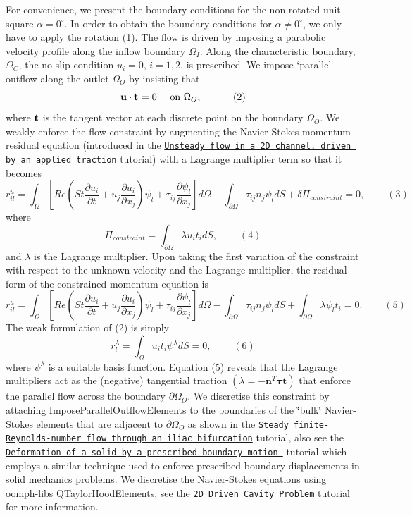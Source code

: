 For convenience, we present the boundary conditions for the non-\/rotated unit square $\alpha = 0^{\circ}$. In order to obtain the boundary conditions for $\alpha \ne 0^\circ$, we only have to apply the rotation (1). The flow is driven by imposing a parabolic velocity profile along the inflow boundary $\Omega_I$. Along the characteristic boundary, $\Omega_C$, the no-\/slip condition $u_i = 0$, $i = 1,2$, is prescribed. We impose `parallel outflow\textquotesingle{} along the outlet $\Omega_O$ by insisting that \[ {\bf u}\cdot {\bf t}_{} = 0 \mbox{\ \ \ \ on $\Omega_{O}$,} \ \ \ \ \ \ \ \ \ \ (2) \] where $ {\bf t}$ is the tangent vector at each discrete point on the boundary $ \Omega_{O}$. We weakly enforce the flow constraint by augmenting the Navier-\/\+Stokes momentum residual equation (introduced in the \href{../../../navier_stokes/rayleigh_traction_channel/html/index.html}{\tt Unsteady flow in a 2D channel, driven by an applied traction} tutorial) with a Lagrange multiplier term so that it becomes \[ r_{il}^{u} = \int_\Omega \left[ Re \left( St\frac{\partial u_i}{\partial t} + u_j\frac{\partial u_i}{\partial x_j} \right) \psi_l + \tau_{ij}\frac{\partial \psi_l}{\partial x_j} \right] d\Omega - \int_{\partial\Omega} \tau_{ij} n_j\psi_l dS + \delta \Pi_{constraint} = 0, \ \ \ \ \ \ \ \ \ \ (3) \] where \[ \Pi_{constraint} = \int_{\partial \Omega} \lambda u_i t_i dS, \ \ \ \ \ \ \ \ \ \ (4) \] and $\lambda$ is the Lagrange multiplier. Upon taking the first variation of the constraint with respect to the unknown velocity and the Lagrange multiplier, the residual form of the constrained momentum equation is \[ r_{il}^{u} = \int_\Omega \left[ Re \left( St\frac{\partial u_i}{\partial t} + u_j\frac{\partial u_i}{\partial x_j} \right) \psi_l + \tau_{ij}\frac{\partial \psi_l}{\partial x_j} \right] d\Omega - \int_{\partial\Omega} \tau_{ij} n_j\psi_l dS + \int_{\partial\Omega} \lambda\psi_l t_i = 0. \ \ \ \ \ \ \ \ \ \ (5) \] The weak formulation of (2) is simply \[ r_{l}^{\lambda} = \int_\Omega u_i t_i \psi^\lambda dS = 0, \ \ \ \ \ \ \ \ \ \ (6) \] where $\psi^\lambda$ is a suitable basis function. Equation (5) reveals that the Lagrange multipliers act as the (negative) tangential traction $(\lambda = -{\mathbf{n}}^T{\mathbf{\tau}}{\mathbf{t}})$ that enforce the parallel flow across the boundary $\partial\Omega_{O}$. We discretise this constraint by attaching {\ttfamily Impose\+Parallel\+Outflow\+Elements} to the boundaries of the \char`\"{}bulk\char`\"{} Navier-\/\+Stokes elements that are adjacent to $ \partial \Omega_O $ as shown in the \href{../../../navier_stokes/vmtk_fluid/html/index.html}{\tt Steady finite-\/\+Reynolds-\/number flow through an iliac bifurcation} tutorial, also see the \href{../../../solid/prescribed_displ_lagr_mult/html/index.html}{\tt Deformation of a solid by a prescribed boundary motion } tutorial which employs a similar technique used to enforce prescribed boundary displacements in solid mechanics problems. We discretise the Navier-\/\+Stokes equations using {\ttfamily oomph-\/lib\textquotesingle{}s} {\ttfamily Q\+Taylor\+Hood\+Elements}, see the \href{../../../navier_stokes/driven_cavity/html/index.html}{\tt 2D Driven Cavity Problem} tutorial for more information.

